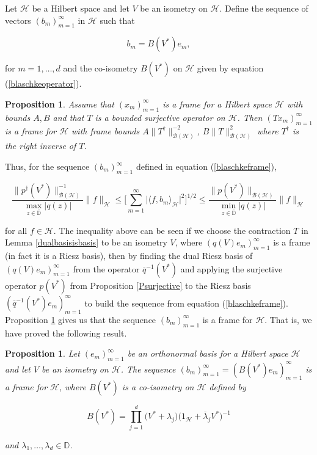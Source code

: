 \documentclass[10pt, reqno]{amsart}
\newtheorem{proposition}[theorem]{Proposition}
\theoremstyle{definition}
\numberwithin{equation}{section}
\begin{document}
Let $\mathcal{H}$ be a Hilbert space and let $V$ be an isometry on $\mathcal{H}$. Define the sequence of vectors $(b_{m})_{m=1}^{\infty}$ in $\mathcal{H}$ such that

\begin{equation}\label{blaschkeframe}
b_{m}=B(V^{*})e_{m},
\end{equation}

\noindent for $m=1,\hdots,d$ and the co-isometry $B(V^{*})$ on $\mathcal{H}$ given by equation (\ref{blaschkeoperator}).

\begin{proposition}{}\label{closedboundedprop}
     Assume that $(x_{m})_{m=1}^{\infty}$ is a frame for a Hilbert space $\mathcal{H}$ with bounds $A,B$ and that $T$ is a bounded surjective operator on $\mathcal{H}$. Then $(Tx_{m})_{m=1}^{\infty}$ is a frame for $\mathcal{H}$ with frame bounds $A\|T^{\dagger}\|_{\mathcal{B(H)}}^{-2}$, $B\|T\|_{\mathcal{B(H)}}^{2}$ where $T^{\dagger}$ is the right inverse of $T$.
\end{proposition}

Thus, for the sequence $(b_{m})_{m=1}^{\infty}$ defined in equation (\ref{blaschkeframe}),

\begin{equation}\label{boundsforexistenceofframe}
\dfrac{\|p^{\dagger}(V^{*})\|_{\mathcal{B}(\mathcal{H})}^{-1}}{\max_{z\in\overline{\mathbb{D}}}|q(z)|}\|f\|_{\mathcal{H}} \leq \Bigg[\sum_{m=1}^{\infty}\lvert \langle f,b_{m}\rangle_{\mathcal{H}}\rvert^{2}\Bigg]^{1/2}\leq \dfrac{\|p(V^{*})\|_{\mathcal{B}(\mathcal{H})}}{{\min_{z\in\overline{\mathbb{D}}}|q(z)|}}\|f\|_{\mathcal{H}}
\end{equation}

\noindent for all $f\in \mathcal{H}$. The inequality above can be seen if we choose the contraction $T$ in Lemma \ref{dualbasisisbasis} to be an isometry $V$, where $(q(V)e_{m})_{m=1}^{\infty}$ is a frame (in fact it is a Riesz basis), then by finding the dual Riesz basis of $(q(V)e_{m})_{m=1}^{\infty}$ from the operator $\overline{q}^{-1}(V^{*})$ and applying the surjective operator $p(V^{*})$ from Proposition \ref{Psurjective} to the Riesz basis $(\overline{q}^{-1}(V^{*})e_{m})_{m=1}^{\infty}$ to build the sequence from equation (\ref{blaschkeframe}). Proposition \ref{closedboundedprop} gives us that the sequence $(b_{m})_{m=1}^{\infty}$ is a frame for $\mathcal{H}$. That is, we have proved the following result.

\begin{proposition}\label{framepropblaschke}
Let $(e_{m})_{m=1}^{\infty}$ be an orthonormal basis for a Hilbert space $\mathcal{H}$ and let $V$ be an isometry on $\mathcal{H}$. The sequence $(b_{m})_{m=1}^{\infty}=(B(V^{*})e_{m})_{m=1}^{\infty}$ is a frame for $\mathcal{H}$, where $B(V^{*})$ is a co-isometry on $\mathcal{H}$ defined by

$$B(V^{*}) = \prod_{j=1}^{d}\big(V^{*}+\lambda_{j}\big)\big(1_{\mathcal{H}}+\overline{\lambda}_{j}V^{*}\big)^{-1}$$

\noindent and $\lambda_{1},\hdots,\lambda_{d} \in\mathbb{D}$.

\end{proposition}
\end{document}
